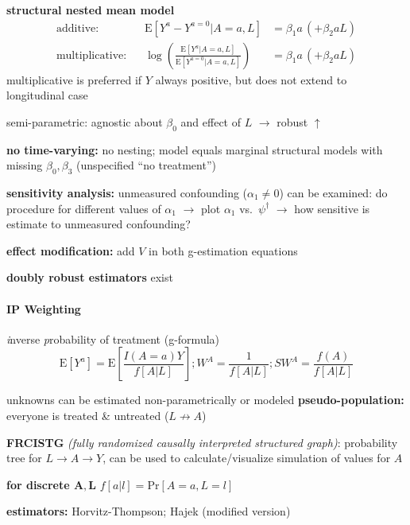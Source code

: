 \documentclass[8pt]{extarticle}
\begin{document}
\begin{multicols}{2}
\noindent \textbf{structural nested mean model}
\begin{align*}
\text{additive: }\,\,\, & \mathrm{E}\left[Y^a-Y^{a=0}|A=a, L\right] &= \beta_1 a \,(+ \beta_2 a L) \\
\text{multiplicative: }\,\,\, & \log \left( \frac{\mathrm{E}\left[Y^a|A=a, L\right]}{\mathrm{E}\left[Y^{a=0}|A=a, L\right]} \right) &= \beta_1 a \,(+ \beta_2 a L)
\end{align*} 
multiplicative is preferred if $Y$ always positive, but does not extend to longitudinal case

\noindent semi-parametric: agnostic about $\beta_0$ and effect of $L$ $\rightarrow$ robust $\uparrow$

\noindent \textbf{no time-varying:} no nesting; model equals marginal structural models with missing $\beta_0, \beta_3$ (unspecified ``no treatment'')

\noindent \textbf{sensitivity analysis:} unmeasured confounding ($\alpha_1 \neq 0$) can be examined: do procedure  for different values of $\alpha_1$ $\rightarrow$ plot $\alpha_1$ vs.\ $\psi^\dagger$ $\rightarrow$ how sensitive is  estimate to unmeasured confounding?

\noindent \textbf{effect modification:} add $V$ in both g-estimation equations %


\noindent \textbf{doubly robust estimators} exist%


\paragraph{\large IP Weighting} \textit{i}nverse \textit{p}robability of treatment (g-formula)
$$\mathrm{E}\left[Y^{a}\right] = \mathrm{E}\left[\frac{I(A=a)Y}{f\left[A|L\right]}\right]; W^A=\frac{1}{f\left[A|L\right]}; SW^A = \frac{f(A)}{f\left[A|L\right]}$$

\noindent unknowns can be estimated non-parametrically or modeled
\noindent \textbf{pseudo-population:} everyone is treated \& untreated ($L\not\to A$)

\noindent \textbf{FRCISTG} \textit{(fully randomized causally interpreted structured graph)}: probability tree for $L \rightarrow A \rightarrow Y$, can be used to calculate/visualize simulation of values for $A$ 

\noindent \textbf{for discrete $\boldsymbol{A, L}$} $f\left[a|l\right] = \mathrm{Pr}\left[A=a,L=l\right]$

\noindent \textbf{estimators:} Horvitz-Thompson; Hajek (modified version) %


\end{multicols}
\end{document}
